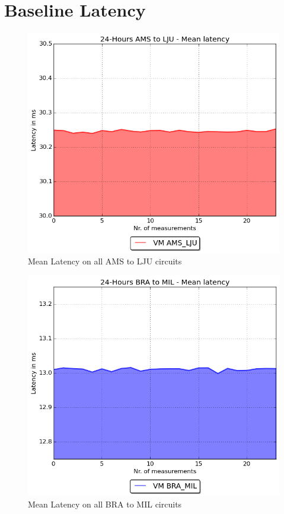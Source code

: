 \begin{appendices}
\begin{lstlisting}
\end{lstlisting}



\newpage
\section{Baseline Latency}\label{app:Baseline}

\begin{figure}[H]
\centering
  \includegraphics[scale=0.5]{img/24H_AMSLJU_MEANLAT.PNG}
  \caption{Mean Latency on all AMS to LJU circuits}
  \label{fig:sub5}
\end{figure}

\begin{figure}[H]
\centering
  \includegraphics[scale=0.5]{img/24H_BRAMIL_MEANLAT.PNG}
  \caption{Mean Latency on all BRA to MIL circuits}
  \label{fig:sub6}
\end{figure}



\end{appendices}
